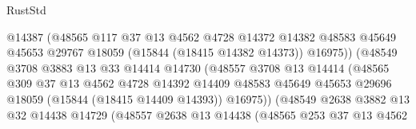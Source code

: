\begin{lexlean}{RustStd}
\begin{coremodule}
                                    @14387
                                    (@48565
                                      @117
                                      @37
                                      @13
                                      @4562
                                      @4728
                                      @14372
                                      @14382
                                      @48583
                                      @45649
                                      @45653
                                      @29767
                                      @18059
                                      (@15844 (@18415 @14382 @14373))
                                      @16975))
                                  (@48549
                                    @3708
                                    @3883
                                    @13
                                    @33
                                    @14414
                                    @14730
                                    (@48557
                                      @3708
                                      @13
                                      @14414
                                      (@48565
                                        @309
                                        @37
                                        @13
                                        @4562
                                        @4728
                                        @14392
                                        @14409
                                        @48583
                                        @45649
                                        @45653
                                        @29696
                                        @18059
                                        (@15844 (@18415 @14409 @14393))
                                        @16975))
                                    (@48549
                                      @2638
                                      @3882
                                      @13
                                      @32
                                      @14438
                                      @14729
                                      (@48557
                                        @2638
                                        @13
                                        @14438
                                        (@48565
                                          @253
                                          @37
                                          @13
                                          @4562

\end{coremodule}
\end{lexlean}
